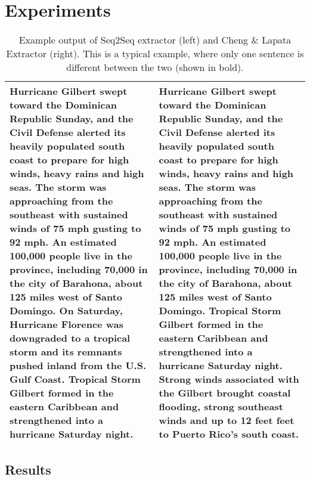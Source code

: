 \documentclass[11pt,a4paper]{article}
\begin{document}
\section{Experiments} \label{sec:exps}


\begin{table*}[ht]
    \footnotesize
\centering
  \begin{tabular}{p{24em} p{24em}}
\toprule
Hurricane Gilbert swept toward the Dominican Republic Sunday, and the 
   Civil Defense alerted its heavily populated south coast to prepare 
   for high winds, heavy rains and high seas.                         
The storm was approaching from the southeast with sustained winds of  
   75 mph gusting to 92 mph.                                          
An estimated 100,000 people live in the province, including 70,000 in 
   the city of Barahona, about 125 miles west of Santo Domingo.       
\textbf{On Saturday, Hurricane Florence was downgraded to a tropical storm and
   its remnants pushed inland from the U.S. Gulf Coast.}               
Tropical Storm Gilbert formed in the eastern Caribbean and            
   strengthened into a hurricane Saturday night.  
&
Hurricane Gilbert swept toward the Dominican Republic Sunday, and the 
   Civil Defense alerted its heavily populated south coast to prepare 
   for high winds, heavy rains and high seas.                         
The storm was approaching from the southeast with sustained winds of  
   75 mph gusting to 92 mph.                                          
An estimated 100,000 people live in the province, including 70,000 in 
   the city of Barahona, about 125 miles west of Santo Domingo.       
Tropical Storm Gilbert formed in the eastern Caribbean and            
   strengthened into a hurricane Saturday night.                      
\textbf{Strong winds associated with the Gilbert brought coastal flooding,    
   strong southeast winds and up to 12 feet feet to Puerto Rico's     
   south coast.}   \\
\bottomrule
\end{tabular}
\caption{Example output of Seq2Seq extractor (left) and Cheng 
\& Lapata Extractor (right). This is a typical example, where only one
 sentence is different between the two (shown in bold). }
\label{tab:output}
\end{table*}

\subsection{Results} 

\end{document}
